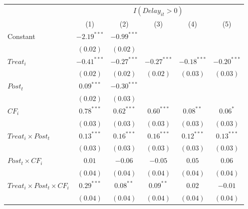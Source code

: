 \documentclass[
]{article}
\begin{document}
\begin{table}
\begin{center}
\begin{tabular}{l c c c c c}
\hline
 & \multicolumn{5}{c}{$I(Delay_{it}>0)$} \\
\cline{2-6}
 & (1) & (2) & (3) & (4) & (5) \\
\hline
Constant                                   & $-2.19^{***}$ & $-0.99^{***}$ &               &               &               \\
                                           & $(0.02)$      & $(0.02)$      &               &               &               \\
$Treat_i$                                  & $-0.41^{***}$ & $-0.27^{***}$ & $-0.27^{***}$ & $-0.18^{***}$ & $-0.20^{***}$ \\
                                           & $(0.02)$      & $(0.02)$      & $(0.02)$      & $(0.03)$      & $(0.03)$      \\
$Post_t$                                   & $0.09^{***}$  & $-0.30^{***}$ &               &               &               \\
                                           & $(0.02)$      & $(0.03)$      &               &               &               \\
$CF_i$                                     & $0.78^{***}$  & $0.62^{***}$  & $0.60^{***}$  & $0.08^{**}$   & $0.06^{*}$    \\
                                           & $(0.03)$      & $(0.03)$      & $(0.03)$      & $(0.03)$      & $(0.03)$      \\
$Treat_i \times Post_t$                    & $0.13^{***}$  & $0.16^{***}$  & $0.16^{***}$  & $0.12^{***}$  & $0.13^{***}$  \\
                                           & $(0.03)$      & $(0.03)$      & $(0.03)$      & $(0.03)$      & $(0.03)$      \\
$Post_t \times CF_i$                       & $0.01$        & $-0.06$       & $-0.05$       & $0.05$        & $0.06$        \\
                                           & $(0.04)$      & $(0.04)$      & $(0.04)$      & $(0.04)$      & $(0.04)$      \\
$Treat_i \times Post_t \times CF_i$        & $0.29^{***}$  & $0.08^{**}$   & $0.09^{**}$   & $0.02$        & $-0.01$       \\
                                           & $(0.04)$      & $(0.04)$      & $(0.04)$      & $(0.04)$      & $(0.04)$      \\

\end{tabular}
\end{center}
\end{table}
\end{document}
